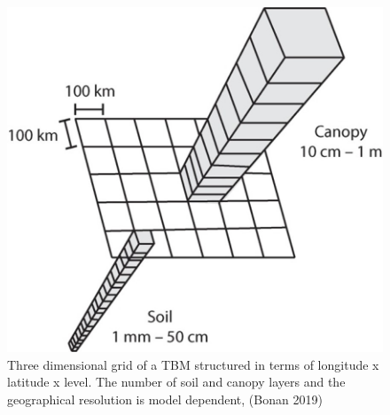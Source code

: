\documentclass[
  oneside]{book}
\begin{document}
\begin{figure}

{\centering \includegraphics[width=0.8\linewidth]{figures/chap1/grid_vert_hor} 

}

\caption{Three dimensional grid of a TBM structured in terms of longitude x latitude x level. The number of soil and canopy layers and the geographical resolution is model dependent, (Bonan 2019)}\label{fig:f10}
\end{figure}
\end{document}
